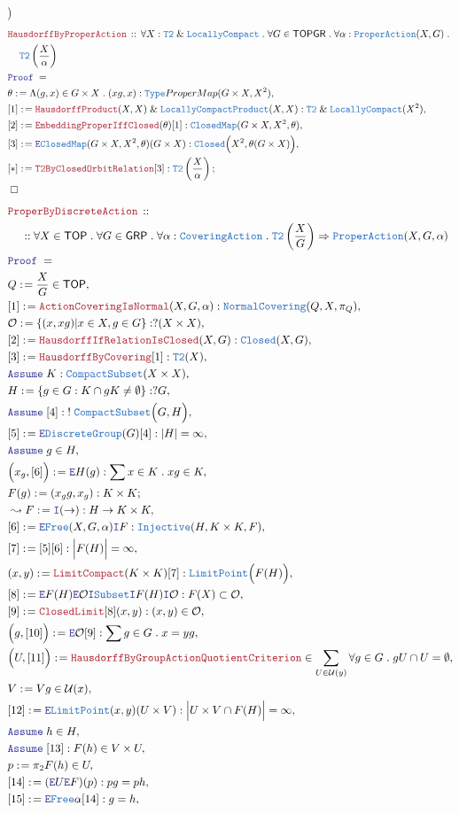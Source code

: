 \documentclass[12pt]{scrartcl}
\newcommand{\TYPE}[1]{\textcolor{NavyBlue}{\mathtt{#1}}}
\newcommand{\LOGIC}[1]{\textcolor{Blue}{\mathtt{#1}}}
\newcommand{\THM}[1]{\textcolor{Maroon}{\mathtt{#1}}}
\renewcommand{\.}{\; . \;}
\newcommand{\de}{: \kern 0.1pc =}
\newcommand{\IsNot}{\; ! \;}
\newcommand{\Theorem}[2]{& \THM{#1} \, :: \, #2 \\ & \Proof = \\ }
\newcommand{\NewLine}{\\ & \kern 1pc}
\newcommand{\Page}[1]{ \begin{align*} #1 \end{align*}   }
\renewcommand{\And}{\; \& \;}
\newcommand{\Imply}{\Rightarrow}
\newcommand{\Intro}{\LOGIC{I}}
\newcommand{\Elim}{\LOGIC{E}}
\newcommand{\Type}{\TYPE{Type}}
\newcommand{\Say}[3]{& #1 \de #2 : #3, \\}
\newcommand{\SayIn}[3]{& #1 \de #2 \in #3, \\}
\newcommand{\Conclude}[3]{& #1 \de #2 : #3; \\}
\newcommand{\Derive}[3]{& \leadsto #1 \de #2 : #3, \\}
\newcommand{\Assume}[2]{& \LOGIC{Assume} \; #1 : #2, \\}
\newcommand{\AssumeIn}[2]{& \LOGIC{Assume} \; #1 \in #2, \\}
\newcommand{\QED}{\; \square}
\newcommand{\EndProof}{& \QED \\}
\newcommand{\Proof}{\LOGIC{Proof} \; }
\newcommand{\TOP}{\mathsf{TOP}}
\newcommand{\U}{\mathcal{U}}
\renewcommand{\O}{\mathcal{O}}
\newcommand{\GRP}{\mathsf{GRP}}
\renewcommand{\O}{\mathcal{O}}
\begin{document}
{{		\bigg)	
	}
}\Page{
	\Theorem{HausdorffByProperAction}
	{
		\forall X : \TYPE{T2} \And \TYPE{LocallyCompact} \.
		\forall G  \in \mathsf{TOPGR}   \.
		\forall \alpha : \TYPE{ProperAction}(X,G) \. \NewLine 
		\TYPE{T2}\left( \frac{X}{\alpha}\right)
	}
	\Say{\theta}{\Lambda (g,x) \in G \times X \. (xg,x)}{\Type{ProperMap}(G \times X, X^2 )}
	\Say{[1]}{\THM{HausdorffProduct}(X,X) \And \TYPE{LocallyCompactProduct}(X,X)}
	{
		\TYPE{T2} \And \TYPE{LocallyCompact}(X^2)
	}
	\Say{[2]}{\THM{EmbeddingProperIffClosed}(\theta)[1]}
	{
		\TYPE{ClosedMap}(G\times X, X^2,\theta)
	}
	\Say{[3]}{\Elim \TYPE{ClosedMap}(G\times X,X^2,\theta)(G \times X)}
	{
		\TYPE{Closed}\Big( X^2, \theta(G \times X) \Big) 
	}
	\Conclude{[*]}{\THM{T2ByClosedOrbitRelation}[3]}
	{
		\TYPE{T2}\left( \frac{X}{\alpha} \right)
	}
	\EndProof
}\Page{
	\Theorem{ProperByDiscreteAction}
	{
		\NewLine ::
		\forall X \in \TOP \.
		\forall G \in \GRP \.  
		\forall \alpha : \TYPE{CoveringAction} \.
		\TYPE{T2}\left(\frac{X}{G}\right) \Imply \TYPE{ProperAction}(X,G,\alpha)
	}
	\SayIn{Q}{\frac{X}{G}}{\TOP}
	\Say{[1]}{\THM{ActionCoveringIsNormal}(X,G,\alpha)}{\TYPE{NormalCovering}(Q,X,\pi_Q)}
	\Say{\O}{\{ (x,xg) | x \in X, g \in G \}}{?(X \times X)}
	\Say{[2]}{\THM{HausdorffIfRelationIsClosed}(X,G)}{\TYPE{Closed}(X,G)}
	\Say{[3]}{\THM{HausdorffByCovering}[1]}{\TYPE{T2}(X)}
	\Assume{K}{\TYPE{CompactSubset}(X \times X)}
	\Say{H}{  \{ g \in G : K \cap gK \neq \emptyset  \} }{?G}
	\Assume{[4]}{\IsNot \TYPE{CompactSubset}\Big( G, H \Big)  }
	\Say{[5]}{\Elim \TYPE{DiscreteGroup}(G)[4]}{|H|=\infty}
	\AssumeIn{g}{H}
	\Say{\Big(x_g,[6]\Big)}{\Elim H(g)}{\sum x \in K \. xg \in K}
	\Conclude{F(g)}{(x_gg,x_g)}{K \times K}
	\Derive{F}{\Intro(\to)}{H \to K \times K}
	\Say{[6]}{\Elim \TYPE{Free}(X,G,\alpha)\Intro F}
	{
		\TYPE{Injective}( H,K \times K, F )	
	}
	\Say{[7]}
	{
		[5][6]
	}
	{
		\Big| F(H) \Big| = \infty	
	}
	\Say{ (x,y)}
	{
		\THM{LimitCompact}(K \times K)[7]
	}
	{
		\TYPE{LimitPoint}\Big( F(H) \Big)
	}
	\Say{[8]}{\Elim F(H) \Elim \O \Intro \TYPE{Subset} \Intro F(H) \Intro \O}{F(X) \subset \O}
	\Say{[9]}{\THM{ClosedLimit}[8](x,y)}{(x,y) \in \O}
	\Say{\Big(g, [10] \Big)}
	{  
		\Elim \O [9]
	}
	{ 
		\sum g \in G \. x = yg
	}
	\SayIn{\Big(U,[11]\Big)}{\THM{HausdorffByGroupActionQuotientCriterion}}{\sum_{U \in \U(y)} \forall g \in G \. gU \cap U = \emptyset}
	\SayIn{V}{Vg}{\U(x)}
	\Say{[12]}{\Elim \TYPE{LimitPoint}(x,y)(U \times V)}{\Big| U \times V \cap F(H) \Big| = \infty}
	\AssumeIn{h}{H}
	\Assume{[13]}{F(h) \in V \times U}
	\SayIn{p}{\pi_2 F(h)}{U}
	\Say{[14]}{(\Elim U \Elim F) (p)}{  p g = p h  }
	\Say{[15]}{ \Elim \TYPE{Free} \alpha [14] }{g = h}
}
\end{document}
